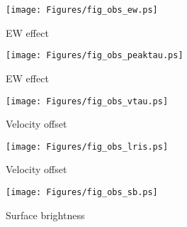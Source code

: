 \documentclass[12pt,preprint]{aastex}
\begin{document}
\begin{figure}
\texttt{[image: Figures/fig\_obs\_ew.ps]}
\caption{
EW effect
}
\label{fig:obs_ew}
\end{figure}

\begin{figure}
\texttt{[image: Figures/fig\_obs\_peaktau.ps]}
\caption{
EW effect
}
\label{fig:obs_peaktau}
\end{figure}

\begin{figure}
\texttt{[image: Figures/fig\_obs\_vtau.ps]}
\caption{
Velocity offset
}
\label{fig:obs_vtau}
\end{figure}

\begin{figure}
\texttt{[image: Figures/fig\_obs\_lris.ps]}
\caption{
Velocity offset
}
\label{fig:obs_lris}
\end{figure}

\begin{figure}
\texttt{[image: Figures/fig\_obs\_sb.ps]}
\caption{
Surface brightness
}
\label{fig:obs_sb}
\end{figure}
\end{document}
